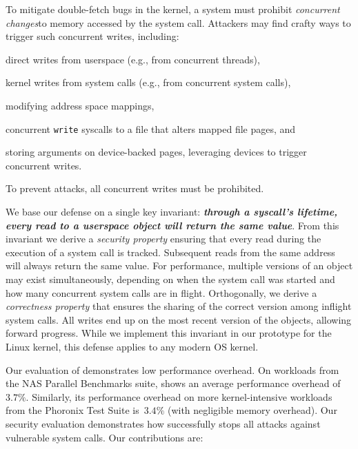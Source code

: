 \documentclass[letterpaper,twocolumn,10pt]{article}
\begin{document}
To mitigate double-fetch bugs in the kernel, a system must prohibit
\emph{concurrent changes}\footnotemark to memory accessed by the system call. Attackers may
find crafty ways to trigger such concurrent writes, including:
\begin{inparaenum}
\item  direct writes from userspace (e.g., from concurrent threads),
\item  kernel writes from system calls (e.g., from concurrent system calls),
\item  modifying address space mappings,
\item  concurrent \texttt{write} syscalls to a file that alters mapped
file pages, and
\item  storing arguments on device-backed pages, leveraging devices to trigger
concurrent writes.
\end{inparaenum}
To prevent attacks, all concurrent writes must be prohibited.

We base our defense on a single key invariant:
\textbf{\emph{through a syscall's lifetime, every read to a userspace object
will return the same value}}. From this invariant we derive a \emph{security
property} ensuring that every read during the execution of a system call is
tracked. Subsequent reads from the same address will always return the same value.
For performance, multiple versions of an object may exist simultaneously,
depending on when the system call was started and how many
concurrent system calls are in flight. Orthogonally, we derive a \emph{correctness
property} that ensures the sharing of the correct version among inflight
system calls. All writes end up on the most recent version of
the objects, allowing forward progress.
While we implement this invariant in our \midas prototype for the Linux kernel,
this defense applies to any modern OS kernel.

Our evaluation of \midas demonstrates low performance overhead.
On workloads from the NAS Parallel Benchmarks suite, \midas shows
an average performance overhead of~$3.7\%$. Similarly, its performance overhead on
more kernel-intensive workloads from the Phoronix Test Suite is~$3.4\%$ (with
negligible memory overhead).
%
Our security evaluation demonstrates how \midas successfully stops all attacks
against vulnerable system calls.
%
Our contributions are:
\end{document}

